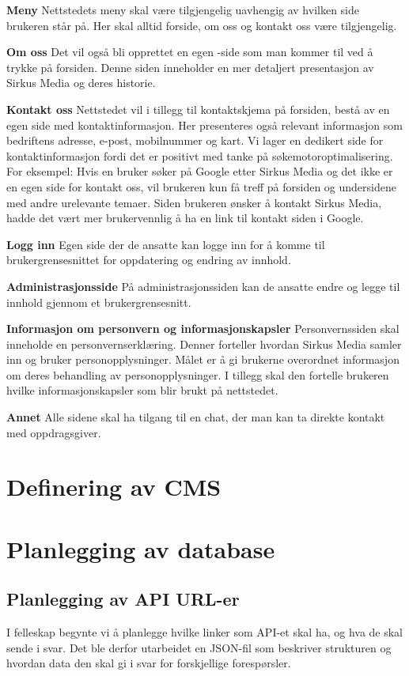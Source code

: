\textbf{Meny} Nettstedets meny skal være tilgjengelig uavhengig av hvilken side brukeren står på. Her skal alltid forside, om oss og kontakt oss være tilgjengelig. 

\textbf{Om oss} Det vil også bli opprettet en egen -side som man kommer til ved å trykke  på forsiden. Denne siden inneholder en mer detaljert presentasjon av Sirkus Media og deres historie.

\textbf{Kontakt oss} Nettstedet vil i tillegg til kontaktskjema på forsiden, bestå av en egen side med kontaktinformasjon. Her presenteres også relevant informasjon som bedriftens adresse, e-post, mobilnummer og kart. Vi lager en dedikert side for kontaktinformasjon fordi det er positivt med tanke på søkemotoroptimalisering. For eksempel: Hvis en bruker søker på Google etter Sirkus Media og det ikke er en egen side for kontakt oss, vil brukeren kun få treff på forsiden og undersidene med andre urelevante temaer. Siden brukeren ønsker å kontakt Sirkus Media,  hadde det vært mer brukervennlig å ha en link til kontakt siden i Google.

\textbf{Logg inn} Egen side der de ansatte kan logge inn for å komme til brukergrensesnittet for oppdatering og endring av innhold.

\textbf{Administrasjonsside}  På administrasjonssiden kan de ansatte endre og legge til innhold gjennom et brukergrensesnitt.

\textbf{Informasjon om personvern og informasjonskapsler} Personvernssiden skal inneholde en personvernserklæring. Denner forteller hvordan Sirkus Media samler inn og bruker personopplysninger. Målet er å gi brukerne overordnet informasjon om deres behandling av personopplysninger. I tillegg skal den fortelle brukeren hvilke informasjonskapsler som blir brukt på nettstedet.

\textbf{Annet} Alle sidene skal ha tilgang til en chat, der man kan ta direkte kontakt med oppdragsgiver.

\section{Definering av CMS}

\section{Planlegging av database}

\subsection{Planlegging av API URL-er}
I felleskap begynte vi å planlegge hvilke linker som API-et skal ha, og hva de skal sende i svar. Det ble derfor utarbeidet en JSON-fil som beskriver strukturen og hvordan data den skal gi i svar for forskjellige forespørsler.

